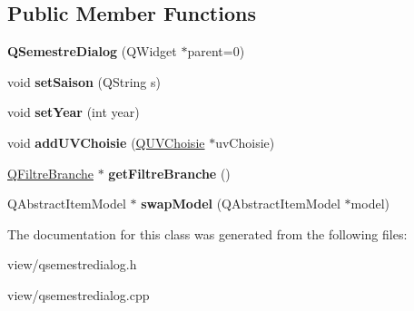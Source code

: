\subsection*{Public Member Functions}
\begin{DoxyCompactItemize}
\item 
\hypertarget{classQSemestreDialog_afcea6ad11ac7bd74ab93733034932610}{{\bfseries Q\+Semestre\+Dialog} (Q\+Widget $\ast$parent=0)}\label{classQSemestreDialog_afcea6ad11ac7bd74ab93733034932610}

\item 
\hypertarget{classQSemestreDialog_a3e0d0c4df63f736ca56129109d5fcfc9}{void {\bfseries set\+Saison} (Q\+String s)}\label{classQSemestreDialog_a3e0d0c4df63f736ca56129109d5fcfc9}

\item 
\hypertarget{classQSemestreDialog_a84d22926ad386a89cdfff95881616837}{void {\bfseries set\+Year} (int year)}\label{classQSemestreDialog_a84d22926ad386a89cdfff95881616837}

\item 
\hypertarget{classQSemestreDialog_ac00400ddaccb765e08d11c8a7463da4c}{void {\bfseries add\+U\+V\+Choisie} (\hyperlink{classQUVChoisie}{Q\+U\+V\+Choisie} $\ast$uv\+Choisie)}\label{classQSemestreDialog_ac00400ddaccb765e08d11c8a7463da4c}

\item 
\hypertarget{classQSemestreDialog_a0c469498643a491f0df42c90b6f0841a}{\hyperlink{classQFiltreBranche}{Q\+Filtre\+Branche} $\ast$ {\bfseries get\+Filtre\+Branche} ()}\label{classQSemestreDialog_a0c469498643a491f0df42c90b6f0841a}

\item 
\hypertarget{classQSemestreDialog_a063d21c055abe5fe3e6020a455a08a64}{Q\+Abstract\+Item\+Model $\ast$ {\bfseries swap\+Model} (Q\+Abstract\+Item\+Model $\ast$model)}\label{classQSemestreDialog_a063d21c055abe5fe3e6020a455a08a64}

\end{DoxyCompactItemize}


The documentation for this class was generated from the following files\+:\begin{DoxyCompactItemize}
\item 
view/qsemestredialog.\+h\item 
view/qsemestredialog.\+cpp\end{DoxyCompactItemize}
